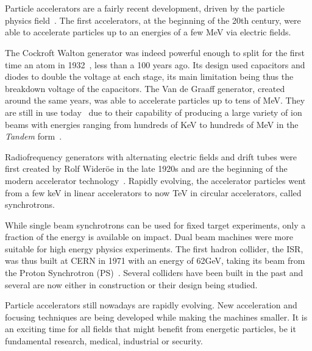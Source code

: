 \section{}

Particle accelerators are a fairly recent development, driven by the particle physics
field~\cite{bryant_brief_1994}. The first accelerators, at the beginning of the 20th century, were
able to accelerate particles up to an energies of a few MeV via electric fields.

The Cockroft Walton generator was indeed powerful enough to split for the first time an atom in
1932~\cite{poole_cockcrofts_2007}, less than a 100 years ago. Its design used capacitors and diodes
to double the voltage at each stage, its main limitation being thus the breakdown voltage of the
capacitors. The Van de Graaff generator, created around the same years, was able to accelerate
particles up to tens of MeV. They are still in use today~\cite{lebois_rapport_2020} due to their
capability of producing a large variety of ion beams with energies ranging from hundreds of KeV to
hundreds of MeV in the \textit{Tandem} form~\cite{hinterberger_electrostatic_2006}.

Radiofrequency generators with alternating electric fields and drift tubes were first created by 
Rolf Wideröe in the late 1920s and are the beginning of the modern accelerator
technology~\cite{vretenar_radio_2011}.  Rapidly evolving, the accelerator particles went from a few
keV in linear accelerators to now TeV in circular accelerators, called synchrotrons.

While single beam synchrotrons can be used for fixed target experiments, only a fraction of the
energy is available on impact. Dual beam machines were more suitable for high energy physics
experiments. The first hadron collider, the ISR, was thus built at CERN in 1971 with an energy
of 62GeV, taking its beam from the Proton Synchrotron (PS)~\cite{philip_cerns_2011}. Several
colliders have been built in the past and several are now either in construction or their design
being studied.

Particle accelerators still nowadays are rapidly evolving. New acceleration and focusing techniques
are being developed while making the machines smaller. It is an exciting time for all fields that
might benefit from energetic particles, be it fundamental research, medical, industrial or security.


